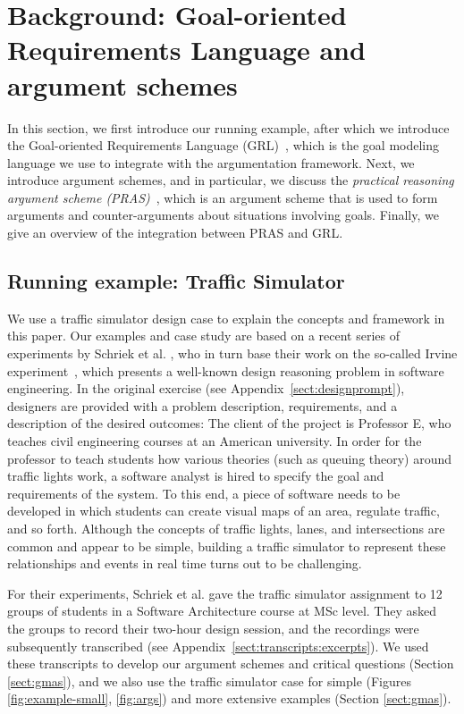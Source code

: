 \section{Background: Goal-oriented Requirements Language and argument schemes}
\label{sect:background}

In this section, we first introduce our running example, after which we introduce the Goal-oriented Requirements Language (GRL)~\cite{Amyot:2010:EGM:1841349.1841356}, which is the goal modeling language we use to integrate with the argumentation framework. Next, we introduce argument schemes, and in particular, we discuss the \emph{practical reasoning argument scheme (PRAS)}~\cite{atkinson2007}, which is an argument scheme that is used to form arguments and counter-arguments about situations involving goals. Finally, we give an overview of the integration between PRAS and GRL.  %

\subsection{Running example: Traffic Simulator}
\label{sect:goals:runningexample}

We use a traffic simulator design case to explain the concepts and framework in this paper. Our examples and case study are based on a recent series of experiments by Schriek et al. \cite{SchriekEtal2016}, who in turn base their work on the so-called Irvine experiment~\cite{UCIworkshop}, which presents a well-known design reasoning problem in software engineering. In the original exercise (see Appendix~\ref{sect:designprompt}), designers are provided with a problem description, requirements, and a description of the desired outcomes: The client of the project is Professor E, who teaches civil engineering courses at an American university. In order for the professor to teach students how various theories (such as queuing theory) around traffic lights work, a software analyst is hired to specify the goal and requirements of the system. To this end, a piece of software needs to be developed in which students can create visual maps of an area, regulate traffic, and so forth. Although the concepts of traffic lights, lanes, and intersections are common and appear to be simple, building a traffic simulator to represent these relationships and events in real time turns out to be challenging. 

For their experiments, Schriek et al. \cite{SchriekEtal2016} gave the traffic simulator assignment to 12 groups of students in a Software Architecture course at MSc level. They asked the groups to record their two-hour design session, and the recordings were subsequently transcribed (see Appendix~\ref{sect:transcripts:excerpts}). We used these transcripts to develop our argument schemes and critical questions (Section \ref{sect:gmas}), and we also use the traffic simulator case for simple (Figures \ref{fig:example-small}, \ref{fig:args}) and more extensive examples (Section \ref{sect:gmas}). 

